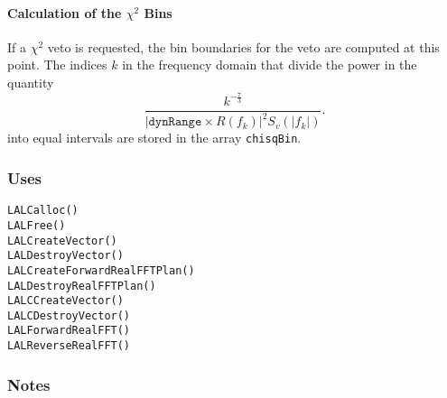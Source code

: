 \paragraph*{Calculation of the $\chi^2$ Bins}

If a $\chi^2$ veto is requested, the bin boundaries for the veto are computed
at this point. The indices $k$ in the frequency domain that divide the power
in the quantity
\begin{equation}
\frac{k^{-\frac{7}{3}}}
{\left|\texttt{dynRange}\times R(f_k)\right|^2 S_v(|f_k|)}.
\end{equation}
into equal intervals are stored in the array \texttt{chisqBin}.

\subsubsection*{Uses}
\begin{verbatim}
LALCalloc()
LALFree()
LALCreateVector()
LALDestroyVector()
LALCreateForwardRealFFTPlan()
LALDestroyRealFFTPlan()
LALCCreateVector()
LALCDestroyVector()
LALForwardRealFFT()
LALReverseRealFFT()
\end{verbatim}

\subsubsection*{Notes}

